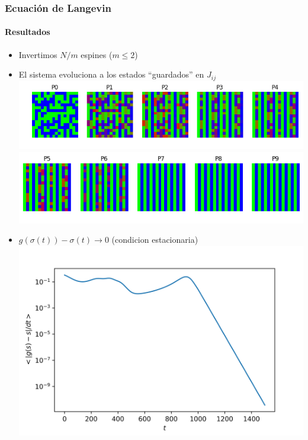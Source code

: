 \documentclass[11pt]{beamer}
\begin{document}
\begin{frame}
\frametitle{Ecuación de Langevin}
\framesubtitle{Resultados}
\begin{itemize}
	\item Invertimos $N/m$ espines ($m \le 2$)
	\item El sistema evoluciona a los estados ``guardados'' en  $J_{ij}$\\
	\centering
	\includegraphics[width=0.75\linewidth]{evolucion_langevin-0.png}
	\includegraphics[width=0.75\linewidth]{evolucion_langevin-1.png}
	\item  $g(\sigma(t)) - \sigma(t) \rightarrow 0$ (condicion estacionaria)
	\centering
	\includegraphics[width=0.45\linewidth]{convergencia_langevin.png}
\end{itemize}
\end{frame}
\end{document}
